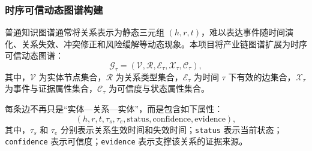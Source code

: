 \documentclass[12pt,a4paper]{article}
\begin{document}
\subsubsection{时序可信动态图谱构建}

普通知识图谱通常将关系表示为静态三元组 $(h,r,t)$，难以表达事件随时间演化、关系失效、冲突修正和风险缓解等动态现象。本项目将产业链图谱扩展为时序可信动态图谱：
\begin{equation}
\mathcal{G}_{\tau} =
\left(
\mathcal{V},
\mathcal{R},
\mathcal{E}_{\tau},
\mathcal{X}_{\tau},
\mathcal{C}_{\tau}
\right),
\end{equation}
其中，$\mathcal{V}$ 为实体节点集合，$\mathcal{R}$ 为关系类型集合，$\mathcal{E}_{\tau}$ 为时间 $\tau$ 下有效的边集合，$\mathcal{X}_{\tau}$ 为事件与证据属性集合，$\mathcal{C}_{\tau}$ 为可信度与状态属性集合。

每条边不再只是“实体—关系—实体”，而是包含如下属性：
\begin{equation}
(h,r,t,\tau_s,\tau_e,\text{status},\text{confidence},\text{evidence}),
\end{equation}
其中，$\tau_s$ 和 $\tau_e$ 分别表示关系生效时间和失效时间；\texttt{status} 表示当前状态；\texttt{confidence} 表示可信度；\texttt{evidence} 表示支撑该关系的证据来源。
\end{document}
